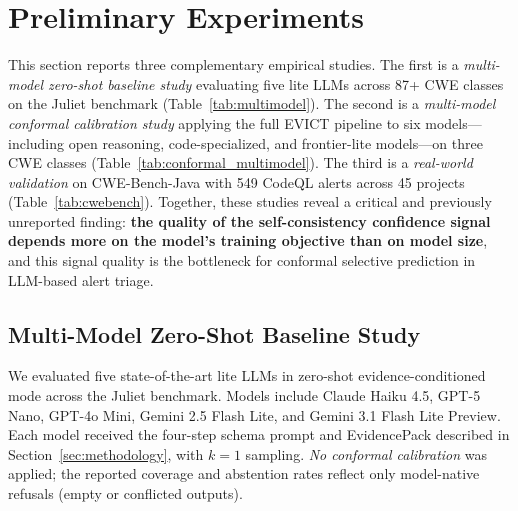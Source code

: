 \section{Preliminary Experiments}
\label{sec:preliminary}

This section reports three complementary empirical studies. The first is a \emph{multi-model zero-shot baseline study} evaluating five lite LLMs across 87+ CWE classes on the Juliet benchmark (Table~\ref{tab:multimodel}). The second is a \emph{multi-model conformal calibration study} applying the full EVICT pipeline to six models---including open reasoning, code-specialized, and frontier-lite models---on three CWE classes (Table~\ref{tab:conformal_multimodel}). The third is a \emph{real-world validation} on CWE-Bench-Java with 549 CodeQL alerts across 45 projects (Table~\ref{tab:cwebench}). Together, these studies reveal a critical and previously unreported finding: \textbf{the quality of the self-consistency confidence signal depends more on the model's training objective than on model size}, and this signal quality is the bottleneck for conformal selective prediction in LLM-based alert triage.

\subsection{Multi-Model Zero-Shot Baseline Study}

We evaluated five state-of-the-art lite LLMs in zero-shot evidence-conditioned mode across the Juliet benchmark. Models include Claude Haiku 4.5, GPT-5 Nano, GPT-4o Mini, Gemini 2.5 Flash Lite, and Gemini 3.1 Flash Lite Preview. Each model received the four-step schema prompt and EvidencePack described in Section~\ref{sec:methodology}, with $k=1$ sampling. \emph{No conformal calibration} was applied; the reported coverage and abstention rates reflect only model-native refusals (empty or conflicted outputs).

